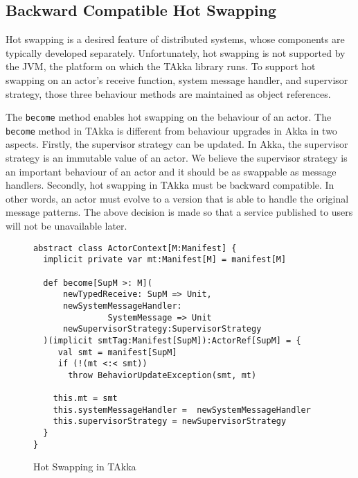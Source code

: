 \subsection{Backward Compatible Hot Swapping}
\label{hot_swapping}
Hot swapping is a desired feature of distributed systems, whose
components are typically developed separately. Unfortunately, hot  
swapping is not supported by the JVM, the platform on which the TAkka 
library runs.  To support hot swapping on an actor's receive function, 
system message handler, and supervisor strategy, those three behaviour 
methods are maintained as object references.

The {\tt become} method enables hot swapping on the behaviour of an 
actor.  The {\tt become} method in TAkka is different from behaviour 
upgrades in  Akka in two aspects.  Firstly, the supervisor strategy can be
updated.  In Akka, the supervisor strategy is an immutable value of an 
actor.  We believe the supervisor strategy is an important behaviour of an 
actor and it should be as swappable as message handlers.  Secondly, 
hot swapping in TAkka must be backward compatible.  In other words, an actor 
must evolve to a version that is able to handle the original
message patterns.  The above decision is made so that a service published to 
users will not be unavailable later.  

\begin{comment}I suggest to enforce backward compatible upgrades whenever
possible to provide better user experience.  If a bad design has to be deprecated,
an error message should be returned, if the received message is a synchronous 
request.  Otherwise, the user cannot tell whether the message is deprecated or lost.}
\end{comment}

\begin{figure}[h]
\label{become}
\begin{lstlisting}
abstract class ActorContext[M:Manifest] {
  implicit private var mt:Manifest[M] = manifest[M]

  def become[SupM >: M](
      newTypedReceive: SupM => Unit,
      newSystemMessageHandler:
               SystemMessage => Unit
      newSupervisorStrategy:SupervisorStrategy
  )(implicit smtTag:Manifest[SupM]):ActorRef[SupM] = {
     val smt = manifest[SupM]
     if (!(mt <:< smt))
       throw BehaviorUpdateException(smt, mt)

    this.mt = smt
    this.systemMessageHandler =  newSystemMessageHandler
    this.supervisorStrategy = newSupervisorStrategy
  }
}
\end{lstlisting}
\caption{Hot Swapping in TAkka}
\end{figure}

